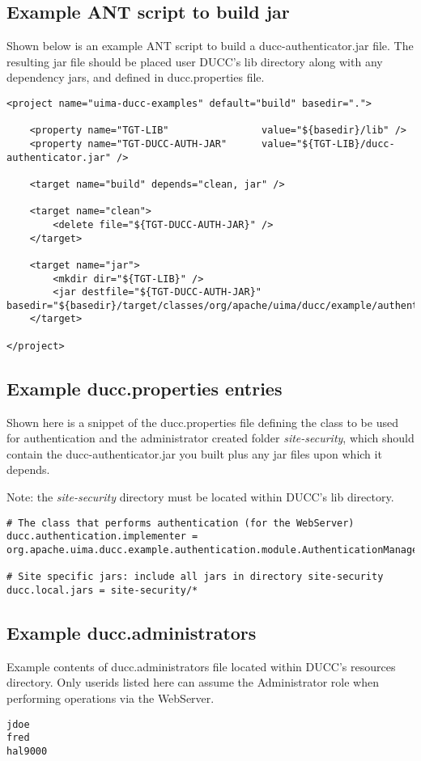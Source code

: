 \subsection{Example ANT script to build jar}
    
    Shown below is an example ANT script to build a ducc-authenticator.jar file.
    The resulting jar file should be placed user DUCC's lib directory along with
    any dependency jars, and defined in ducc.properties file.
    
    \begin{verbatim}
<project name="uima-ducc-examples" default="build" basedir=".">
    
    <property name="TGT-LIB"                value="${basedir}/lib" />
    <property name="TGT-DUCC-AUTH-JAR"      value="${TGT-LIB}/ducc-authenticator.jar" />
    
    <target name="build" depends="clean, jar" />
    
    <target name="clean">
        <delete file="${TGT-DUCC-AUTH-JAR}" />
    </target>
    
    <target name="jar">
        <mkdir dir="${TGT-LIB}" />
        <jar destfile="${TGT-DUCC-AUTH-JAR}" basedir="${basedir}/target/classes/org/apache/uima/ducc/example/authentication/module"/>
    </target>
    
</project>
    \end{verbatim}
    
\subsection{Example ducc.properties entries}
    
    Shown here is a snippet of the ducc.properties file defining the class to be
    used for authentication and the administrator created folder
    {\em site-security}, which should contain the ducc-authenticator.jar you
    built plus any jar files upon which it depends.
    
    Note: the {\em site-security} directory must be located within DUCC's lib
    directory.
    
    \begin{verbatim}
# The class that performs authentication (for the WebServer)
ducc.authentication.implementer = org.apache.uima.ducc.example.authentication.module.AuthenticationManager

# Site specific jars: include all jars in directory site-security
ducc.local.jars = site-security/*
    \end{verbatim}
    
\subsection{Example ducc.administrators}
    
    Example contents of ducc.administrators file located within DUCC's resources
    directory. Only userids listed here can assume the Administrator role when 
    performing operations via the WebServer.
    
    \begin{verbatim}
jdoe
fred
hal9000
    \end{verbatim}


  
